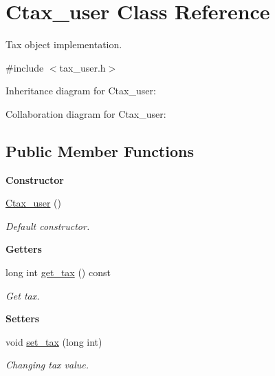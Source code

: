 \hypertarget{class_ctax__user}{}\section{Ctax\+\_\+user Class Reference}
\label{class_ctax__user}


Tax object implementation.  




{\ttfamily \#include $<$tax\+\_\+user.\+h$>$}



Inheritance diagram for Ctax\+\_\+user\+:


Collaboration diagram for Ctax\+\_\+user\+:
\subsection*{Public Member Functions}
\begin{Indent}{\bf Constructor}\par
\begin{DoxyCompactItemize}
\item 
\hyperlink{class_ctax__user_ae6899d23d2994b08747ab5797bd4c8ac}{Ctax\+\_\+user} ()
\begin{DoxyCompactList}\small\item\em Default constructor. \end{DoxyCompactList}\end{DoxyCompactItemize}
\end{Indent}
\begin{Indent}{\bf Getters}\par
\begin{DoxyCompactItemize}
\item 
long int \hyperlink{class_ctax__user_a824f6643ab14fb2ae4233641a08aff68}{get\+\_\+tax} () const 
\begin{DoxyCompactList}\small\item\em Get tax. \end{DoxyCompactList}\end{DoxyCompactItemize}
\end{Indent}
\begin{Indent}{\bf Setters}\par
\begin{DoxyCompactItemize}
\item 
void \hyperlink{class_ctax__user_abc465fdfa520b34c223016c1a926ddb1}{set\+\_\+tax} (long int)
\begin{DoxyCompactList}\small\item\em Changing tax value. \end{DoxyCompactList}\end{DoxyCompactItemize}
\end{Indent}

